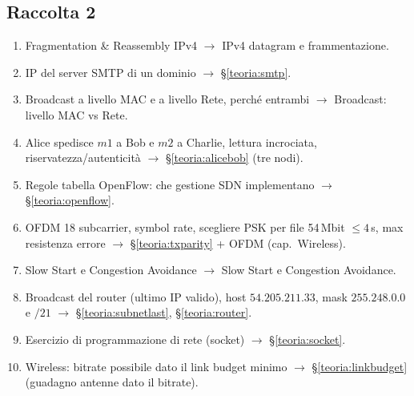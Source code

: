 \documentclass[11pt,a4paper]{report}
\begin{document}
\subsection*{Raccolta 2}
\begin{enumerate}[noitemsep]
\item Fragmentation \& Reassembly IPv4 $\to$ IPv4 datagram e frammentazione.
\item IP del server SMTP di un dominio $\to$ \S\ref{teoria:smtp}.
\item Broadcast a livello MAC e a livello Rete, perché entrambi $\to$ Broadcast: livello MAC vs Rete.
\item Alice spedisce $m1$ a Bob e $m2$ a Charlie, lettura incrociata, riservatezza/autenticità $\to$ \S\ref{teoria:alicebob} (tre nodi).
\item Regole tabella OpenFlow: che gestione SDN implementano $\to$ \S\ref{teoria:openflow}.
\item OFDM 18 subcarrier, symbol rate, scegliere PSK per file 54\,Mbit $\le 4$\,s, max resistenza errore $\to$ \S\ref{teoria:txparity} + OFDM (cap.\ Wireless).
\item Slow Start e Congestion Avoidance $\to$ Slow Start e Congestion Avoidance.
\item Broadcast del router (ultimo IP valido), host $54.205.211.33$, mask $255.248.0.0$ e $/21$ $\to$ \S\ref{teoria:subnetlast}, \S\ref{teoria:router}.
\item Esercizio di programmazione di rete (socket) $\to$ \S\ref{teoria:socket}.
\item Wireless: bitrate possibile dato il link budget minimo $\to$ \S\ref{teoria:linkbudget} (guadagno antenne dato il bitrate).
\end{enumerate}
\end{document}
